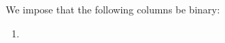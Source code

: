 We impose that the following columns be binary:
\begin{multicols}{2}
	\begin{enumerate}
		\item \logLogsData{} \duplicateConstraint
	\end{enumerate}
\end{multicols}
